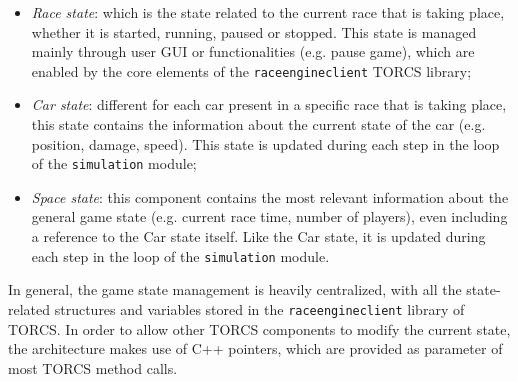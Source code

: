 \begin{itemize}
	\item \textit{Race state}: which is the state related to the current race that is taking place, whether it is started, running, paused or stopped. This state is managed mainly through user GUI or functionalities (e.g. pause game), which are enabled by the core elements of the \texttt{raceengineclient} TORCS library;
	\item \textit{Car state}: different for each car present in a specific race that is taking place, this state contains the information about the current state of the car (e.g. position, damage, speed). This state is updated during each step in the loop of the \texttt{simulation} module;
	\item \textit{Space state}: this component contains the most relevant information about the general game state (e.g. current race time, number of players), even including a reference to the Car state itself. Like the Car state, it is updated during each step in the loop of the \texttt{simulation} module. 
\end{itemize}
In general, the game state management is heavily centralized, with all the state-related structures and variables stored in the \texttt{raceengineclient} library of TORCS. In order to allow other TORCS components to modify the current state, the architecture makes use of C++ pointers, which are provided as parameter of most TORCS method calls. 
\pagebreak

